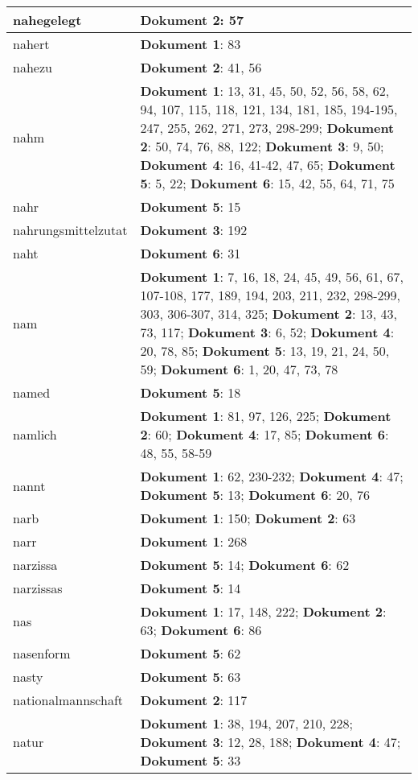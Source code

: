 \documentclass[a5paper]{article}
\begin{document}
\begin{longtable}[l]{|l|p{3in}|}
\hline
nahegelegt & \textbf{Dokument 2}: 57 \\
\hline
nahert & \textbf{Dokument 1}: 83 \\
\hline
nahezu & \textbf{Dokument 2}: 41, 56 \\
\hline
nahm & \textbf{Dokument 1}: 13, 31, 45, 50, 52, 56, 58, 62, 94, 107, 115, 118, 121, 134, 181, 185, 194-195, 247, 255, 262, 271, 273, 298-299; \textbf{Dokument 2}: 50, 74, 76, 88, 122; \textbf{Dokument 3}: 9, 50; \textbf{Dokument 4}: 16, 41-42, 47, 65; \textbf{Dokument 5}: 5, 22; \textbf{Dokument 6}: 15, 42, 55, 64, 71, 75 \\
\hline
nahr & \textbf{Dokument 5}: 15 \\
\hline
nahrungsmittelzutat & \textbf{Dokument 3}: 192 \\
\hline
naht & \textbf{Dokument 6}: 31 \\
\hline
nam & \textbf{Dokument 1}: 7, 16, 18, 24, 45, 49, 56, 61, 67, 107-108, 177, 189, 194, 203, 211, 232, 298-299, 303, 306-307, 314, 325; \textbf{Dokument 2}: 13, 43, 73, 117; \textbf{Dokument 3}: 6, 52; \textbf{Dokument 4}: 20, 78, 85; \textbf{Dokument 5}: 13, 19, 21, 24, 50, 59; \textbf{Dokument 6}: 1, 20, 47, 73, 78 \\
\hline
named & \textbf{Dokument 5}: 18 \\
\hline
namlich & \textbf{Dokument 1}: 81, 97, 126, 225; \textbf{Dokument 2}: 60; \textbf{Dokument 4}: 17, 85; \textbf{Dokument 6}: 48, 55, 58-59 \\
\hline
nannt & \textbf{Dokument 1}: 62, 230-232; \textbf{Dokument 4}: 47; \textbf{Dokument 5}: 13; \textbf{Dokument 6}: 20, 76 \\
\hline
narb & \textbf{Dokument 1}: 150; \textbf{Dokument 2}: 63 \\
\hline
narr & \textbf{Dokument 1}: 268 \\
\hline
narzissa & \textbf{Dokument 5}: 14; \textbf{Dokument 6}: 62 \\
\hline
narzissas & \textbf{Dokument 5}: 14 \\
\hline
nas & \textbf{Dokument 1}: 17, 148, 222; \textbf{Dokument 2}: 63; \textbf{Dokument 6}: 86 \\
\hline
nasenform & \textbf{Dokument 5}: 62 \\
\hline
nasty & \textbf{Dokument 5}: 63 \\
\hline
nationalmannschaft & \textbf{Dokument 2}: 117 \\
\hline
natur & \textbf{Dokument 1}: 38, 194, 207, 210, 228; \textbf{Dokument 3}: 12, 28, 188; \textbf{Dokument 4}: 47; \textbf{Dokument 5}: 33 \\

\end{longtable}
\end{document}
